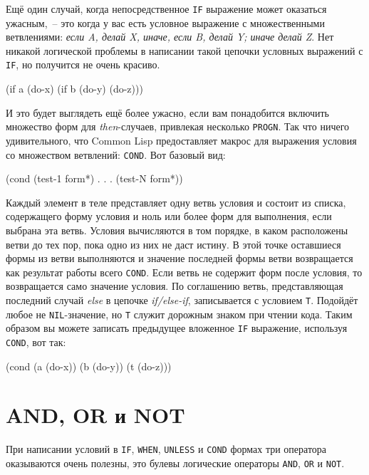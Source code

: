 Ещё один случай, когда непосредственное \lstinline{IF} выражение может оказаться ужасным,~-- это
когда у вас есть условное выражение с множественными ветвлениями: \textit{если A, делай X,
  иначе, если B, делай Y; иначе делай Z}. Нет никакой логической проблемы в написании
такой цепочки условных выражений с \lstinline{IF}, но получится не очень красиво.

\begin{myverb}
(if a
    (do-x)
    (if b
       (do-y)
       (do-z)))
\end{myverb}

И это будет выглядеть ещё более ужасно, если вам понадобится включить множество форм для
\textit{then}-случаев, привлекая несколько \lstinline{PROGN}. Так что ничего удивительного, что
Common Lisp предоставляет макрос для выражения условия со множеством ветвлений:
\lstinline{COND}. Вот базовый вид:

\begin{myverb}
(cond
  (test-1 form*)
      .
      .
      .
  (test-N form*))
\end{myverb}

Каждый элемент в теле представляет одну ветвь условия и состоит из списка, содержащего
форму условия и ноль или более форм для выполнения, если выбрана эта ветвь. Условия
вычисляются в том порядке, в каком расположены ветви до тех пор, пока одно из них не даст
истину. В этой точке оставшиеся формы из ветви выполняются и значение последней формы
ветви возвращается как результат работы всего \lstinline{COND}. Если ветвь не содержит форм
после условия, то возвращается само значение условия. По соглашению ветвь, представляющая
последний случай \textit{else} в цепочке \textit{if/else-if}, записывается с условием
\lstinline{T}. Подойдёт любое не \lstinline{NIL}-значение, но \lstinline{T} служит дорожным знаком при
чтении кода. Таким образом вы можете записать предыдущее вложенное \lstinline{IF} выражение,
используя \lstinline{COND}, вот так:

\begin{myverb}
(cond (a (do-x))
      (b (do-y))
      (t (do-z)))
\end{myverb}

\section{AND, OR и NOT}


При написании условий в \lstinline{IF}, \lstinline{WHEN}, \lstinline{UNLESS} и \lstinline{COND} формах три
оператора оказываются очень полезны, это булевы логические операторы \lstinline{AND}, \lstinline{OR}
и \lstinline{NOT}.

